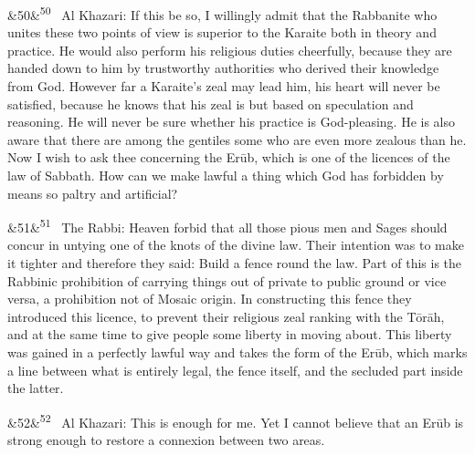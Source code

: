 \documentclass[12pt]{article}
\newcommand{\para}[1][]{\par\noindent\ifx&#1&\else\textsuperscript{\footnotesize #1}~\fi}
\begin{document}
\para[50] Al Khazari: If this be so, I willingly admit that the Rabbanite who unites these two points of view is superior to the Karaite both in theory and practice. He would also perform his religious duties cheerfully, because they are handed down to him by trustworthy authorities who derived their knowledge from God. However far a Karaite's zeal may lead him, his heart will never be satisfied, because he knows that his zeal is but based on speculation and reasoning. He will never be sure whether his practice is God-pleasing. He is also aware that there are among the gentiles some who are even more zealous than he. Now I wish to ask thee concerning the Erūb, which is one of the licences of the law of Sabbath. How can we make lawful a thing which God has forbidden by means so paltry and artificial?

\para[51] The Rabbi: Heaven forbid that all those pious men and Sages should concur in untying one of the knots of the divine law. Their intention was to make it tighter and therefore they said: Build a fence round the law. Part of this is the Rabbinic prohibition of carrying things out of private to public ground or vice versa, a prohibition not of Mosaic origin. In constructing this fence they introduced this licence, to prevent their religious zeal ranking with the Tōrāh, and at the same time to give people some liberty in moving about. This liberty was gained in a perfectly lawful way and takes the form of the Erūb, which marks a line between what is entirely legal, the fence itself, and the secluded part inside the latter.

\para[52] Al Khazari: This is enough for me. Yet I cannot believe that an Erūb is strong enough to restore a connexion between two areas.
\end{document}
